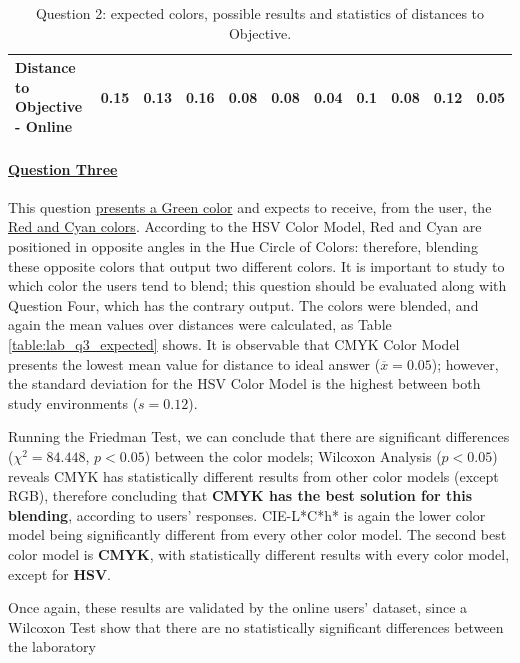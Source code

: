 \begin{table}[H]
{\begin{tabular}{lccccccccccccc}
    \multicolumn{4}{l}{Distance to Objective - Online}                                                                                               & \multicolumn{1}{|c}{0.15}       & \multicolumn{1}{c|}{0.13}    & \multicolumn{1}{|c}{0.16}       & \multicolumn{1}{c|}{0.08}    & \multicolumn{1}{|c}{\textbf{0.08}}       & \multicolumn{1}{c|}{0.04}    & \multicolumn{1}{|c}{0.1}        & \multicolumn{1}{c|}{0.08}    & \multicolumn{1}{|c}{0.12}       & \multicolumn{1}{c|}{0.05}    \\ \hline
    \end{tabular}}
  \caption[Question 2, with expected Results.]{Question 2: expected colors, possible results and statistics of distances to Objective.}
  \label{table:lab_q2_expected}
\end{table}
%
%
\paragraph{\ul{Question Three}}
%
This question \ul{presents a Green color} and expects to receive, from the user, the \ul{Red and Cyan colors}. According to the HSV Color
Model, Red and Cyan are positioned in opposite angles in the Hue Circle of Colors: therefore, blending these opposite colors that output two
different colors. It is important to study to which color the users tend to blend; this question should be evaluated along with Question Four,
which has the contrary output. The colors were blended, and again the mean values over distances were calculated, as Table \ref{table:lab_q3_expected}
shows. It is observable that CMYK Color Model presents the lowest mean value for distance to ideal answer ($\overline{x} = 0.05$); however,
the standard deviation for the HSV Color Model is the highest between both study environments ($s = 0.12$). \par
%
Running the Friedman Test, we can conclude that there are significant differences ($\chi^2 = 84.448$, $p < 0.05$) between the color models;
Wilcoxon Analysis ($p < 0.05$) reveals CMYK has statistically different results from other color models (except RGB), therefore concluding that
\textbf{CMYK has the best solution for this blending}, according to users' responses. CIE-L*C*h* is again the lower color model being
significantly different from every other color model. The second best color model is \textbf{CMYK}, with statistically different results with
every color model, except for \textbf{HSV}. \par
%
Once again, these results are validated by the online users' dataset, since a Wilcoxon Test show that there are no statistically significant differences between the laboratory
